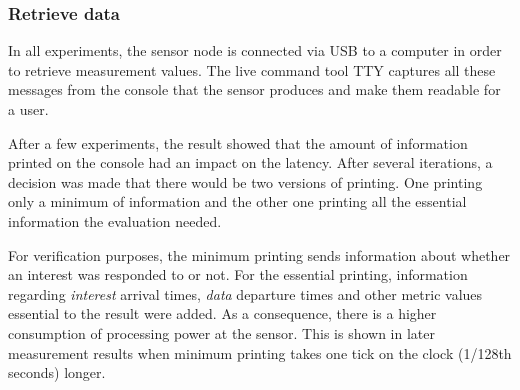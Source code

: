 \subsubsection{Retrieve data}
In all experiments, the sensor node is connected via USB to a computer in order to retrieve measurement values. The live command tool TTY captures all these messages from the console that the sensor produces and make them readable for a user. 

After a few experiments, the result showed that the amount of information printed on the console had an impact on the latency.
After several iterations, a decision was made that there would be two versions of printing. One printing only a minimum of information and the other one printing all the essential information the evaluation needed. 

For verification purposes, the minimum printing sends information about whether an interest was responded to or not. 
For the essential printing, information regarding \textit{interest} arrival times, \textit{data} departure times and other metric values essential to the result were added. As a consequence, there is a higher consumption of processing power at the sensor. This is shown in later measurement results when minimum printing takes one tick on the clock (1/128th seconds) longer.
